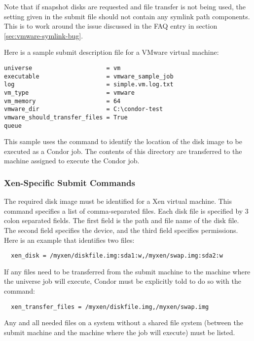 Note that if snapshot disks are requested and file transfer is not
being used, the  setting given in the submit
file should not contain any symlink path components. This is to work
around the issue discussed in the FAQ entry in section~
\ref{sec:vmware-symlink-bug}.

Here is a sample submit description file for a VMware virtual machine:
\begin{verbatim}
universe                     = vm
executable                   = vmware_sample_job
log                          = simple.vm.log.txt
vm_type                      = vmware
vm_memory                    = 64
vmware_dir                   = C:\condor-test
vmware_should_transfer_files = True
queue
\end{verbatim}
This sample uses the  command to identify
the location of the disk image to be executed as a Condor job.
The contents of this directory are transferred to the machine assigned
to execute the Condor job.

\subsubsection{\label{sec:vm-Xensubmitfile}Xen-Specific Submit Commands}

The required disk image must be identified for a Xen virtual machine.
This  command specifies a list of comma-separated files.
Each disk file is specified by 3 colon separated fields.
The first field is the path and file name of the disk file.
The second field specifies the device,
and the third field specifies permissions.
Here is an example that identifies two files:
\footnotesize
\begin{verbatim}
  xen_disk = /myxen/diskfile.img:sda1:w,/myxen/swap.img:sda2:w
\end{verbatim}
\normalsize

If any files need to be transferred from the submit machine
to the machine where the  universe job will execute, 
Condor must be explicitly told to do so with the 
 command:
\footnotesize
\begin{verbatim}
  xen_transfer_files = /myxen/diskfile.img,/myxen/swap.img
\end{verbatim}
\normalsize
Any and all needed files on a system without a shared file
system (between the submit machine and the machine where the
job will execute) must be listed.

